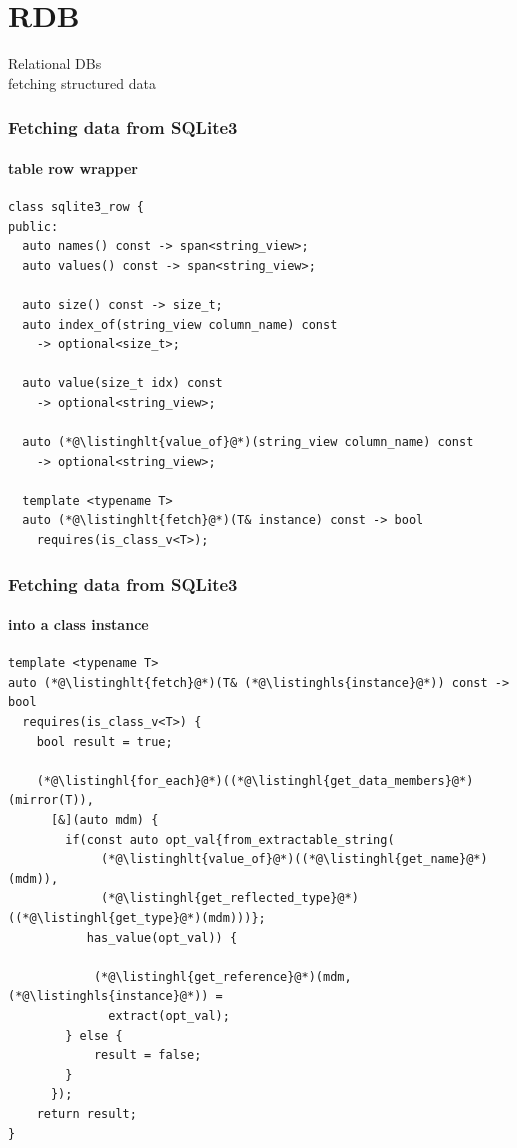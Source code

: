 \documentclass[compress,table,xcolor=table]{beamer}
\begin{document}
\section{RDB}
\begin{frame}[c]
  \Huge
  \centering
  Relational DBs\\
  \Large
  fetching structured data
\end{frame}
\begin{frame}[fragile]
  \frametitle{Fetching data from SQLite3}
  \framesubtitle{table row wrapper}
  \begin{lstlisting}[language=c++2x,basicstyle=\footnotesize\ttfamily]
class sqlite3_row {
public:
  auto names() const -> span<string_view>;
  auto values() const -> span<string_view>;

  auto size() const -> size_t;
  auto index_of(string_view column_name) const
    -> optional<size_t>;

  auto value(size_t idx) const
    -> optional<string_view>;

  auto (*@\listinghlt{value_of}@*)(string_view column_name) const
    -> optional<string_view>;

  template <typename T>
  auto (*@\listinghlt{fetch}@*)(T& instance) const -> bool
    requires(is_class_v<T>);
  \end{lstlisting}
\end{frame}
\begin{frame}[fragile]
  \frametitle{Fetching data from SQLite3}
  \framesubtitle{into a class instance}
  \begin{lstlisting}[language=c++2x,basicstyle=\scriptsize\ttfamily]
template <typename T>
auto (*@\listinghlt{fetch}@*)(T& (*@\listinghls{instance}@*)) const -> bool
  requires(is_class_v<T>) {
    bool result = true;

    (*@\listinghl{for_each}@*)((*@\listinghl{get_data_members}@*)(mirror(T)),
      [&](auto mdm) {
        if(const auto opt_val{from_extractable_string(
             (*@\listinghlt{value_of}@*)((*@\listinghl{get_name}@*)(mdm)),
             (*@\listinghl{get_reflected_type}@*)((*@\listinghl{get_type}@*)(mdm)))};
           has_value(opt_val)) {

            (*@\listinghl{get_reference}@*)(mdm, (*@\listinghls{instance}@*)) =
              extract(opt_val);
        } else {
            result = false;
        }
      });
    return result;
}
  \end{lstlisting}
\end{frame}
\end{document}
